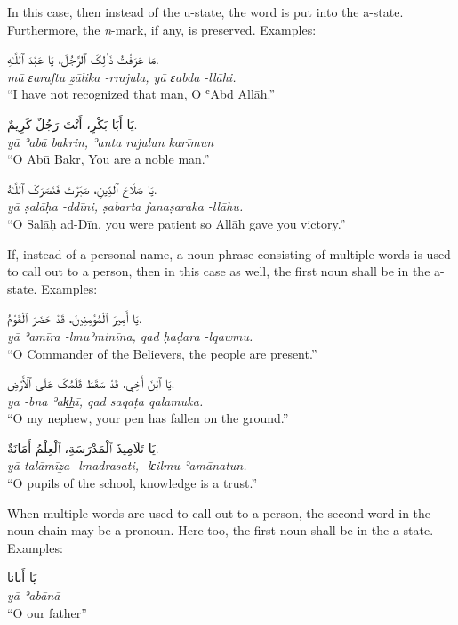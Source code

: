 \documentclass[
  10pt,
]{book}
\begin{document}
In this case, then instead of the u-state, the word is put into the a-state. Furthermore, the \emph{n}-mark, if any, is preserved. Examples:

\foreignlanguage{arabic}{مَا عَرَفْتُ ذَ ٰلِکَ ٱلرَّجُلَ، يَا عَبْدَ ٱللَّـٰهِ.}\\
\emph{mā ɛaraftu ẕālika -rrajula, yā ɛabda -llāhi.}\\
\enquote{I have not recognized that man, O ʿAbd Allāh.}

\foreignlanguage{arabic}{يَا أَبَا بَکْرٍ، أَنْتَ رَجُلٌ کَرِيمٌ.}\\
\emph{yā ʾabā bakrin, ʾanta rajulun karīmun}\\
\enquote{O Abū Bakr, You are a noble man.}

\foreignlanguage{arabic}{يَا صَلَاحَ ٱلدِّينِ، صَبَرْتَ فَنَصَرَکَ ٱللَّـٰهُ.}\\
\emph{yā ṣalāḥa -ddīni, ṣabarta fanaṣaraka -llāhu.}\\
\enquote{O Salāḥ ad-Dīn, you were patient so Allāh gave you victory.}

If, instead of a personal name, a noun phrase consisting of multiple words is used to call out to a person, then in this case as well, the first noun shall be in the a-state. Examples:

\foreignlanguage{arabic}{يَا أَمِيرَ ٱلْمُؤمِنِينَ، قَدْ حَضَرَ ٱلْقَوْمُ.}\\
\emph{yā ʾamīra -lmuʾminīna, qad ḥaḍara -lqawmu.}\\
\enquote{O Commander of the Believers, the people are present.}

\foreignlanguage{arabic}{يَا ٱبْنَ أَخِي، قَدْ سَقَطَ قَلَمُکَ عَلَى ٱلْأَرْضِ.}\\
\emph{ya -bna ʾak͟hī, qad saqaṭa qalamuka.}\\
\enquote{O my nephew, your pen has fallen on the ground.}

\foreignlanguage{arabic}{يَا تَلَامِيذَ ٱلْمَدْرَسَةِ، ٱلْعِلْمُ أَمَانَةٌ.}\\
\emph{yā talāmīẕa -lmadrasati, -lɛilmu ʾamānatun.}\\
\enquote{O pupils of the school, knowledge is a trust.}

When multiple words are used to call out to a person, the second word in the noun-chain may be a pronoun. Here too, the first noun shall be in the a-state. Examples:

\foreignlanguage{arabic}{يَا أَبانا}\\
\emph{yā ʾabānā}\\
\enquote{O our father}
\end{document}
